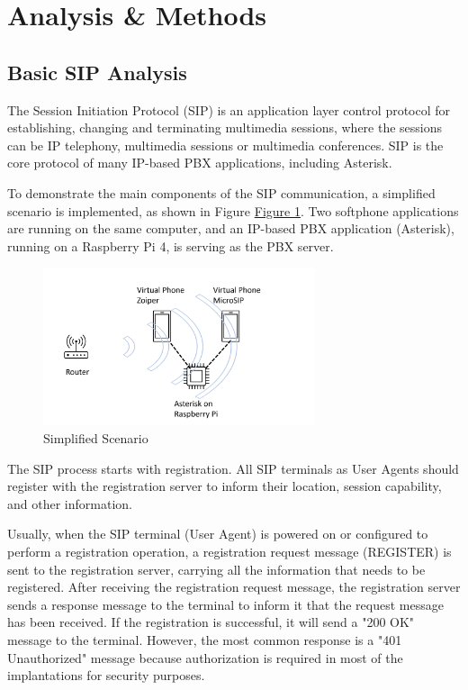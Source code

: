 \section{Analysis \& Methods}	\label{sec:analysis-methods}

	\subsection{Basic SIP Analysis}
		The Session Initiation Protocol (SIP) is an application layer control protocol for establishing, changing and terminating multimedia sessions, where the sessions can be IP telephony, multimedia sessions or multimedia conferences. SIP is the core protocol of many IP-based PBX applications, including Asterisk.
		
		To demonstrate the main components of the SIP communication, a simplified scenario is implemented, as shown in Figure  \hyperref[fig:topo]{Figure \ref{fig:topo}}. Two softphone applications are running on the same computer, and an IP-based PBX application (Asterisk), running on a Raspberry Pi 4, is serving as the PBX server.
		
		\begin{figure}[htbp]
			\centerline{\includegraphics[width=8cm]{Images/experiment/exp1.png}}
			\caption{Simplified Scenario}
			\label{fig:topo}
		\end{figure}
		
		The SIP process starts with registration. All SIP terminals as User Agents should register with the registration server to inform their location, session capability, and other information.
		
		Usually, when the SIP terminal (User Agent) is powered on or configured to perform a registration operation, a registration request message (REGISTER) is sent to the registration server, carrying all the information that needs to be registered. After receiving the registration request message, the registration server sends a response message to the terminal to inform it that the request message has been received. If the registration is successful, it will send a "200 OK" message to the terminal. However, the most common response is a "401 Unauthorized" message because authorization is required in most of the implantations for security purposes. 
		
